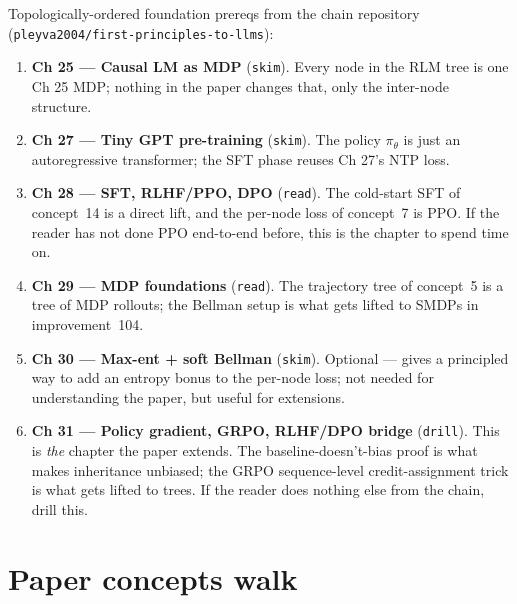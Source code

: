 \documentclass[11pt]{article}
\begin{document}
Topologically-ordered foundation prereqs from the chain repository
(\texttt{pleyva2004/first-principles-to-llms}):
\begin{enumerate}
\item \textbf{Ch 25 --- Causal LM as MDP} (\texttt{skim}). Every node in the RLM
      tree is one Ch 25 MDP; nothing in the paper changes that, only the
      inter-node structure.
\item \textbf{Ch 27 --- Tiny GPT pre-training} (\texttt{skim}). The policy
      $\pi_\theta$ is just an autoregressive transformer; the SFT phase reuses
      Ch 27's NTP loss.
\item \textbf{Ch 28 --- SFT, RLHF/PPO, DPO} (\texttt{read}). The cold-start SFT
      of concept~14 is a direct lift, and the per-node loss of concept~7 is
      PPO. If the reader has not done PPO end-to-end before, this is the
      chapter to spend time on.
\item \textbf{Ch 29 --- MDP foundations} (\texttt{read}). The trajectory tree
      of concept~5 is a tree of MDP rollouts; the Bellman setup is what gets
      lifted to SMDPs in improvement~104.
\item \textbf{Ch 30 --- Max-ent + soft Bellman} (\texttt{skim}). Optional ---
      gives a principled way to add an entropy bonus to the per-node loss; not
      needed for understanding the paper, but useful for extensions.
\item \textbf{Ch 31 --- Policy gradient, GRPO, RLHF/DPO bridge} (\texttt{drill}).
      This is \emph{the} chapter the paper extends. The
      baseline-doesn't-bias proof is what makes inheritance unbiased; the GRPO
      sequence-level credit-assignment trick is what gets lifted to trees. If
      the reader does nothing else from the chain, drill this.
\end{enumerate}

\section{Paper concepts walk}
\end{document}
